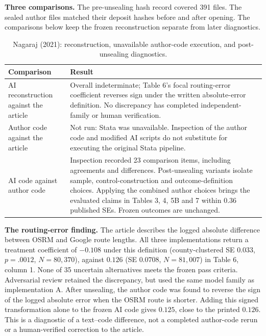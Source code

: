 \documentclass[11pt]{article}
\begin{document}


\textbf{Three comparisons.} The pre-unsealing hash record covered 391 files. The sealed author files matched their deposit hashes before and after opening. The comparisons below keep the frozen reconstruction separate from later diagnostics.
\begin{table}[H]\centering\small
\begin{tabularx}{\linewidth}{@{}p{.29\linewidth}Y@{}}\toprule
Comparison & Result\\\midrule
AI reconstruction against the article & Overall indeterminate; Table 6's focal routing-error coefficient reverses sign under the written absolute-error definition. No discrepancy has completed independent-family or human verification.\\
Author code against the article & Not run: Stata was unavailable. Inspection of the author code and modified AI scripts do not substitute for executing the original Stata pipeline.\\
AI code against author code & Inspection recorded 23 comparison items, including agreements and differences. Post-unsealing variants isolate sample, control-construction and outcome-definition choices. Applying the combined author choices brings the evaluated claims in Tables 3, 4, 5B and 7 within 0.36 published SEs. Frozen outcomes are unchanged.\\\bottomrule
\end{tabularx}\caption{Nagaraj (2021): reconstruction, unavailable author-code execution, and post-unsealing diagnostics.}\label{tab:nagaraj-comparisons}\end{table}

\textbf{The routing-error finding.} The article describes the logged absolute difference between OSRM and Google route lengths. All three implementations return a treatment coefficient of $-0.108$ under this definition (county-clustered SE $0.033$, $p=.0012$, $N=80{,}370$), against $0.126$ (SE $0.0708$, $N=81{,}007$) in Table 6, column 1. None of 35 uncertain alternatives meets the frozen pass criteria. Adversarial review retained the discrepancy, but used the same model family as implementation A. After unsealing, the author code was found to reverse the sign of the logged absolute error when the OSRM route is shorter. Adding this signed transformation alone to the frozen AI code gives $0.125$, close to the printed $0.126$. This is a diagnostic of a text--code difference, not a completed author-code rerun or a human-verified correction to the article.
\end{document}
